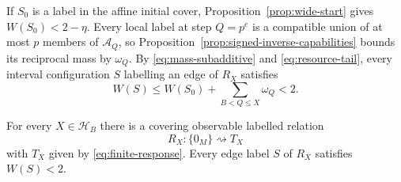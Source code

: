 If $S_0$ is a label in the affine initial cover, Proposition~\ref{prop:wide-start} gives $W(S_0)<2-\eta$.  Every local label at step $Q=p^e$ is a compatible union of at most $p$ members of $\mathcal A_Q$, so Proposition~\ref{prop:signed-inverse-capabilities} bounds its reciprocal mass by $\omega_Q$.  By \eqref{eq:mass-subadditive} and \eqref{eq:resource-tail}, every interval configuration $S$ labelling an edge of $R_X$ satisfies
\begin{equation}\label{eq:physical-W-less-2}
W(S)
\le W(S_0)+\sum_{B<Q\le X}\omega_Q
<2.
\end{equation}

\begin{proposition}\label{prop:finite-realization}
For every $X\in\mathcal H_B$ there is a covering observable labelled relation
\[
R_X:\{0_M\}\rightsquigarrow T_X
\]
with $T_X$ given by \eqref{eq:finite-response}.  Every edge label $S$ of $R_X$ satisfies $W(S)<2$.
\end{proposition}
